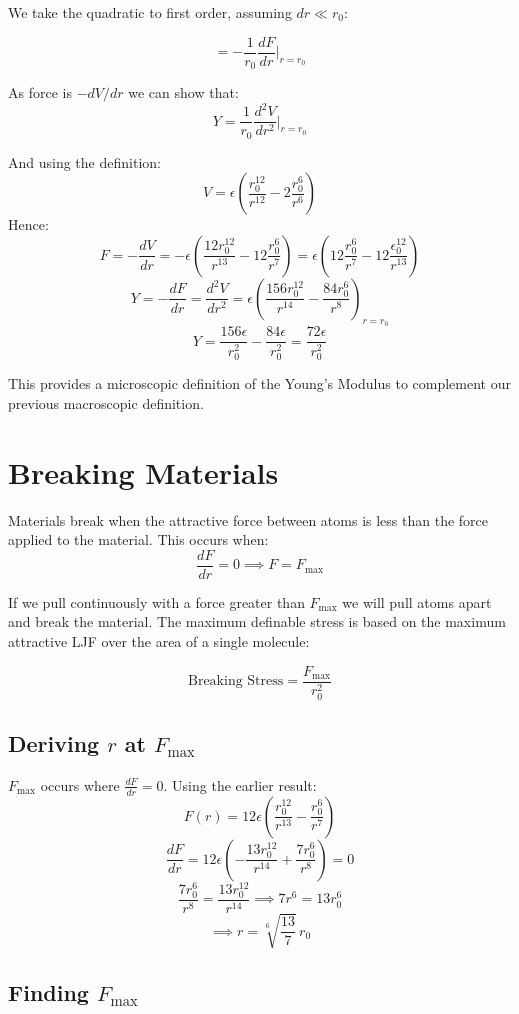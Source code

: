 We take the quadratic to first order, assuming $dr \ll r_0$:

\[
    = - \frac{1}{r_0} \frac{dF}{dr}\biggr\rvert_{r = r_0}
\]

As force is $- dV / dr$ we can show that:
\[
    Y = \frac{1}{r_0} \frac{d^2 V}{dr^2} \biggr\rvert_{r = r_0}
\]

And using the definition:
\[
    V = \epsilon \left(\frac{r_0^{12}}{r^{12}} - 2 \frac{r_0^6}{r^6}\right)
\]
Hence:
\[
    F = - \frac{dV}{dr} = -\epsilon \left(\frac{12r_0^{12}}{r^{13}} - 12 \frac{r_0^6}{r^7}\right) = \epsilon \left(12 \frac{r_0^6}{r^7} - 12\frac{\epsilon_0^{12}}{r^{13}}\right)
\]
\[
    Y = - \frac{dF}{dr} = \frac{d^2 V}{dr^2} = \epsilon \left(\frac{156r_0^{12}}{r^{14}} - \frac{84 r_0^6}{r^8}\right)_{r = r_0}
\]
\[
    Y = \frac{156 \epsilon}{r_0^2} - \frac{84 \epsilon}{r_0^2} = \boxed{\frac{72 \epsilon}{r_0^2}}
\]

This provides a microscopic definition of the Young's Modulus to complement our previous macroscopic definition.

\section{Breaking Materials}
Materials break when the attractive force between atoms is less than the force applied to the material. This occurs when:
\[
    \frac{dF}{dr} = 0 \implies F = F_\text{max}
\]

If we pull continuously with a force greater than $F_\text{max}$ we will pull atoms apart and break the material. The maximum definable stress is based on the maximum attractive LJF over the area of a single molecule:

\[
    \text{Breaking Stress} = \frac{F_\text{max}}{r^2_0}
\]

\subsection{Deriving $r$ at $F_\text{max}$}

$F_\text{max}$ occurs where $\frac{dF}{dr} = 0$. Using the earlier result:
\[
    F(r) = 12\epsilon \left(\frac{r_0^{12}}{r^{13}} - \frac{r_0^6}{r^7}\right)
\]
\[
    \frac{dF}{dr} = 12\epsilon \left(-\frac{13r_0^{12}}{r^{14}} + \frac{7r_0^6}{r^{8}}\right) = 0
\]
\[
    \frac{7r_0^6}{r^8} = \frac{13r_0^{12}}{r^{14}} \implies 7r^6 = 13r_0^6
\]
\[
    \implies \boxed{r = \sqrt[6]{\frac{13}{7}}\, r_0}
\]

\subsection{Finding $F_\text{max}$}

